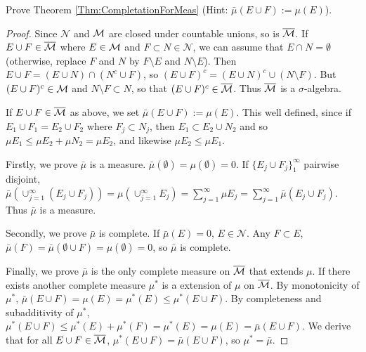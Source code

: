\begin{exc}
    Prove Theorem \ref{Thm:CompletationForMeas} 
    (Hint: $\bar{\mu}(E\cup F):=\mu(E)$).
\end{exc}
\begin{proof}
    Since $\mathcal{N}$ and $\mathcal{M}$ are closed under countable unions,
    so is $\overline{\mathcal{M}}$.
    If $E\cup F\in\overline{\mathcal{M}}$ where $E\in\mathcal{M}$ and $F\subset N\in\mathcal{N}$,
    we can assume that $E\cap N=\emptyset$ 
    (otherwise, replace $F$ and $N$ by $F\setminus E$ and $N\setminus E$).
    Then $E\cup F=(E\cup N)\cap(N^c\cup F)$,
    so $(E\cup F)^c=(E\cup N)^c\cup(N\setminus F)$.
    But $(E\cup F)^c\in\mathcal{M}$ and $N\setminus F\subset N$, so that $(E\cup F)^c\in\overline{\mathcal{M}}$.
    Thus $\overline{\mathcal{M}}$ is a $\sigma$-algebra.

    If $E\cup F\in\overline{\mathcal{M}}$ as above, we set $\bar{\mu}(E\cup F):=\mu(E)$.
    This well defined, since if $E_1\cup F_1=E_2\cup F_2$ where $F_j\subset N_j$,
    then $E_1\subset E_2\cup N_2$ and so $\mu{E_1}\leq\mu{E_2}+\mu{N_2}=\mu{E_2}$,
    and likewise $\mu{E_2}\leq\mu{E_1}$.

    Firstly, we prove $\bar{\mu}$ is a measure. $\bar{\mu}(\emptyset)=\mu(\emptyset)=0$.
    If $\{E_j\cup F_j\}_{1}^{\infty}$ pairwise disjoint, 
    $\bar{\mu}(\cup_{j=1}^{\infty}(E_j\cup F_j))=\mu(\cup_{j=1}^{\infty}E_j)=\sum_{j=1}^{\infty}\mu{E_j}=\sum_{j=1}^{\infty}\bar{\mu}(E_j\cup F_j)$.
    Thus $\bar{\mu}$ is a measure.

    Secondly, we prove $\bar{\mu}$ is complete. If $\bar{\mu}(E)=0$, $E\in\mathcal{N}$.
    Any $F\subset E$, $\bar{\mu}(F)=\bar{\mu}(\emptyset\cup F)=\mu(\emptyset)=0$, 
    so $\bar{\mu}$ is complete.

    Finally, we prove $\bar{\mu}$ is the only complete measure on $\overline{\mathcal{M}}$ that extends $\mu$.
    If there exists another complete measure $\mu^*$ is a extension of $\mu$ on $\overline{\mathcal{M}}$.
    By monotonicity of $\mu^*$, $\bar{\mu}(E\cup F)=\mu(E)=\mu^*(E)\leq\mu^*(E\cup F)$.
    By completeness and subadditivity of $\mu^*$, 
    $\mu^*(E\cup F)\leq\mu^*(E)+\mu^*(F)=\mu^*(E)=\mu(E)=\bar{\mu}(E\cup F)$.
    We derive that for all $E\cup F\in\overline{\mathcal{M}}$, $\mu^*(E\cup F)=\bar{\mu}(E\cup F)$, 
    so $\mu^*=\bar{\mu}$.
\end{proof}
